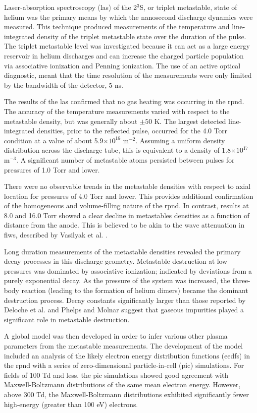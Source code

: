 Laser-absorption spectroscopy (\acs{las}) of the 2$^3$S, or triplet metastable,
state of helium was the primary means by which the nanosecond discharge dynamics
were measured. This technique produced measurements of the temperature and
line-integrated density of the triplet metastable state over the duration of the
pulse. The triplet metastable level was investigated because it can act as a
large energy reservoir in helium discharges and can increase the charged
particle population via associative ionization and Penning ionization. The use
of an active optical diagnostic, meant that the time resolution of the
measurements were only limited by the bandwidth of the detector, 5 ns.

The results of the \acs{las} confirmed that no gas heating was occurring in the
\acs{rpnd}. The accuracy of the temperature measurements varied with respect to
the metastable density, but was generally about $\pm50$ K. The largest detected
line-integrated densities, prior to the reflected pulse, occurred for the 4.0
Torr condition at a value of about 5.9$\times10^{16}$ m$^{-2}$. Assuming a
uniform density distribution across the discharge tube, this is equivalent to a
density of 1.8$\times10^{17}$ m$^{-3}$. A significant number of metastable atoms
persisted between pulses for pressures of 1.0 Torr and lower.

There were no observable trends in the metastable densities with respect to
axial location for pressures of 4.0 Torr and lower. This provides additional
confirmation of the homogeneous and volume-filling nature of the \acs{rpnd}. In
contrast, results at 8.0 and 16.0 Torr showed a clear decline in metastables
densities as a function of distance from the anode. This is believed to be akin
to the wave attenuation in \acs{fiw}s, described by Vasilyak et al.
\cite{Vasilyak1994}.

Long duration measurements of the metastable densities revealed the primary
decay processes in this discharge geometry. Metastable destruction at low
pressures was dominated by associative ionization; indicated by deviations from
a purely exponential decay. As the pressure of the system was increased, the
three-body reaction (leading to the formation of helium dimers) became the
dominant destruction process. Decay constants significantly larger than
those reported by Deloche et al. \cite{Deloche1976} and Phelps and Molnar
\cite{Phelps1953} suggest that gaseous impurities played a significant role in
metastable destruction.

A global model was then developed in order to infer various other plasma
parameters from the metastable measurements. The development of the model
included an analysis of the likely electron energy distribution functions
(\acs{eedf}s) in the \acs{rpnd} with a series of zero-dimensional
particle-in-cell (\acs{pic}) simulations. For fields of 100 Td and less, the
\acs{pic} simulations showed good agreement with Maxwell-Boltzmann distributions
of the same mean electron energy. However, above 300 Td, the Maxwell-Boltzmann
distributions exhibited significantly fewer high-energy (greater than 100 eV)
electrons.

